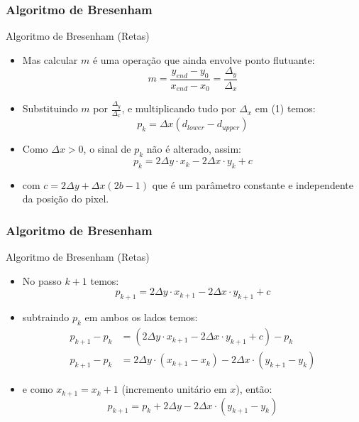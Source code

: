 \documentclass{beamer}
\begin{document}
\begin{frame}
\frametitle{Algoritmo de Bresenham}
		\begin{block}{Algoritmo de Bresenham (Retas)}
		\begin{itemize}
			\item Mas calcular $m$ é uma operação que ainda envolve ponto flutuante:
			\begin{equation*}
				m = \frac{y_{end} - y_0}{x_{end} - x_0} = \frac{\Delta_y}{\Delta_x}
			\end{equation*}
			\item Substituindo  $m$ por $\frac{\Delta_y}{\Delta_x}$, e multiplicando tudo por $\Delta_x$ em (1) temos:
			\begin{equation*}
				p_k = \Delta x (d_{lower} - d_{upper} )
			\end{equation*}
			\item Como $\Delta x > 0$, o sinal de $p_k$ não é alterado, assim:
				\begin{equation*}
					p_k = 2 \Delta y \cdot x_k - 2 \Delta x \cdot y_k + c
				\end{equation*}
			\item com $c = 2\Delta y + \Delta x(2b-1)$ que é um parâmetro constante e independente da posição do pixel.
		\end{itemize}
	\end{block}
\end{frame}

\begin{frame}
\frametitle{Algoritmo de Bresenham}
		\begin{block}{Algoritmo de Bresenham (Retas)}
		\begin{itemize}
			\item No passo $k+1$ temos:
			\begin{equation*}
				p_{k+1} = 2 \Delta y \cdot x_{k+1} - 2 \Delta x \cdot y_{k+1} + c
			\end{equation*}
			\item subtraindo $p_k$ em ambos os lados temos:
			\begin{align*}
				p_{k+1} - p_k &= (2 \Delta y \cdot x_{k+1} - 2 \Delta x \cdot y_{k+1} + c) - p_k \\
				p_{k+1} - p_k &= 2 \Delta y \cdot (x_{k+1} - x_k) - 2 \Delta x \cdot (y_{k+1} - y_k)
			\end{align*}
			\item e como $x_{k+1} = x_k+1$ (incremento unitário em $x$), então:
				\begin{equation*}
					p_{k+1} = p_k + 2 \Delta y - 2 \Delta x \cdot (y_{k+1} - y_k)
				\end{equation*}
		\end{itemize}
	\end{block}
\end{frame}
\end{document}
